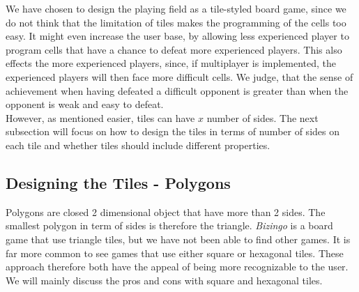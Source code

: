 We have chosen to design the playing field as a tile-styled board game, since we do not think that the limitation of tiles makes the programming of the cells too easy. It might even increase the user base, by allowing less experienced player to program cells that have a chance to defeat more experienced players. This also effects the more experienced players, since, if multiplayer is implemented, the experienced players will then face more difficult cells. We judge, that the sense of achievement when having defeated a difficult opponent is greater than when the opponent is weak and easy to defeat.\\

However, as mentioned easier, tiles can have $x$ number of sides. The next subsection will focus on how to design the tiles in terms of number of sides on each tile and whether tiles should include different properties.

\subsection{Designing the Tiles - Polygons}

Polygons are closed 2 dimensional object that have more than 2 sides. The smallest polygon in term of sides is therefore the triangle. \textit{Bizingo} is a board game that use triangle tiles, but we have not been able to find other games. It is far more common to see games that use either square or hexagonal tiles. These approach therefore both have the appeal of being more recognizable to the user. We will mainly discuss the pros and cons with square and hexagonal tiles.\\




